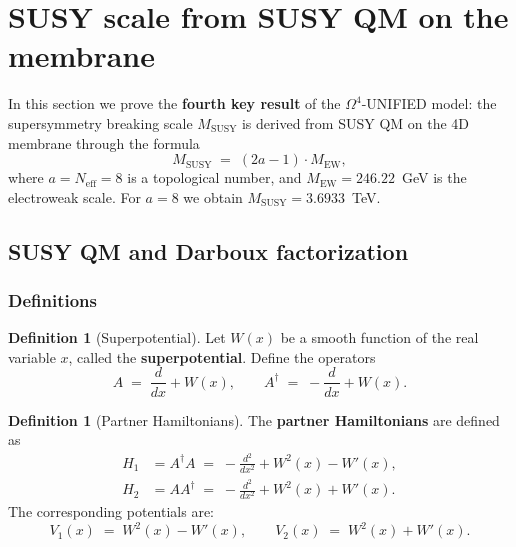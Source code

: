 \documentclass[11pt,a4paper]{article}
\newcommand{\Om}{\ensuremath{\Omega^4}}
\theoremstyle{definition}
\newtheorem{definition}[theorem]{Definition}
\begin{document}
\section{SUSY scale from SUSY QM on the membrane}
\label{sec:susy}

In this section we prove the \textbf{fourth key result}
of the $\Om$-UNIFIED model: the supersymmetry breaking scale
$M_{\text{SUSY}}$ is derived from SUSY QM on the 4D membrane through
the formula
\begin{equation}
    M_{\text{SUSY}} \;=\; (2a - 1) \cdot M_{\text{EW}},
    \label{eq:MSUSY-preview}
\end{equation}
where $a = N_{\text{eff}} = 8$ is a topological number,
and $M_{\text{EW}} = 246.22$~GeV is the electroweak scale.
For $a = 8$ we obtain $M_{\text{SUSY}} = 3.6933$~TeV.

\subsection{SUSY QM and Darboux factorization}
\label{subsec:susy-qm}

\subsubsection{Definitions}

\begin{definition}[Superpotential]
\label{def:superpotential}
Let $W(x)$ be a smooth function of the real variable $x$,
called the \textbf{superpotential}. Define the operators
\begin{equation}
    A \;=\; \frac{d}{dx} + W(x), \qquad
    A^\dagger \;=\; -\frac{d}{dx} + W(x).
    \label{eq:operators-A}
\end{equation}
\end{definition}

\begin{definition}[Partner Hamiltonians]
\label{def:partner-hamiltonians}
The \textbf{partner Hamiltonians} are defined as
\begin{align}
    H_1 &= A^\dagger A
    \;=\; -\frac{d^2}{dx^2} + W^2(x) - W'(x), \label{eq:H1} \\[0.3em]
    H_2 &= A A^\dagger
    \;=\; -\frac{d^2}{dx^2} + W^2(x) + W'(x). \label{eq:H2}
\end{align}
The corresponding potentials are:
\begin{equation}
    V_1(x) \;=\; W^2(x) - W'(x), \qquad
    V_2(x) \;=\; W^2(x) + W'(x).
    \label{eq:partner-potentials}
\end{equation}
\end{definition}
\end{document}
